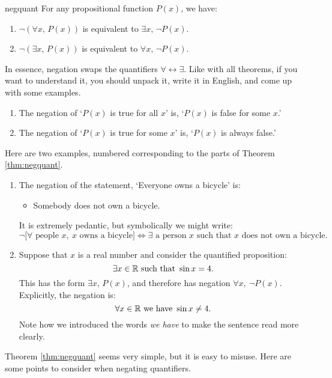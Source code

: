 \begin{thm}{}{negquant}
For any propositional function $P(x)$, we have:
\begin{enumerate}
  \item $\neg(\forall x,\, P(x))$ is equivalent to $\exists x,\, \neg P(x)$.
  \item $\neg(\exists x,\, P(x))$ is equivalent to $\forall x,\, \neg P(x)$.
\end{enumerate}
\end{thm}
In essence, negation swaps the quantifiers $\forall\leftrightarrow\exists$. Like with all theorems, if you want to understand it, you should unpack it, write it in English, and come up with some examples.
\begin{enumerate}
  \item The negation of `$P(x)$ is true for all $x$' is, `$P(x)$ is false for some $x$.'
  \item The negation of `$P(x)$ is true for some $x$' is, `$P(x)$ is always false.'
\end{enumerate}


\begin{examples}
Here are two examples, numbered corresponding to the parts of Theorem \ref{thm:negquant}.
\begin{enumerate}
	\item The negation of the statement, `Everyone owns a bicycle' is:
	\begin{itemize}
  	\item[] Somebody does not own a bicycle.
	\end{itemize}
	It is extremely pedantic, but symbolically we might write:
	\[\neg\Big[\forall\text{ people }x,\ x\text{ owns a bicycle}\Big]\iff \exists\text{ a person $x$ such that $x$ does not own a bicycle}.\]
	\item Suppose that $x$ is a real number and consider the quantified proposition:
	\[\exists x\in\mathbb{R}\text{ such that }\sin x=4.\]
	This has the form $\exists x,\,P(x)$, and therefore has negation $\forall x,\ \neg P(x)$. Explicitly, the negation is:
	\[\forall x\in\mathbb{R}\text{ we have }\sin x\neq 4.\]
	Note how we introduced the words \emph{we have} to make the sentence read more clearly.
\end{enumerate}
\end{examples}


Theorem \ref{thm:negquant} seems very simple, but it is easy to misuse. Here are some points to consider when negating quantifiers.


